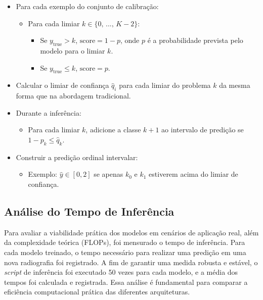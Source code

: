 \begin{itemize}
    \item Para cada exemplo do conjunto de calibração:
    \begin{itemize}
        \item Para cada limiar $k \in \lbrace 0 \text{, } ... \text{, } K-2 \rbrace$:
            \begin{itemize}
                \item Se $y_{\text{true}} > k$, $\text{score} = 1 - p$, onde $p$ é a probabilidade prevista pelo modelo para o limiar $k$.
                \item Se $y_{\text{true}} \leq k$, $\text{score} = p$.
            \end{itemize}
    \end{itemize}
    \item Calcular o limiar de confiança $\hat{q}_i$ para cada limiar do problema $k$ da mesma forma que na abordagem tradicional.
    \item Durante a inferência:
        \begin{itemize}
            \item Para cada limiar $k$, adicione a classe $k+1$ ao intervalo de predição se $1 - p_k \leq \hat{q}_k$.
        \end{itemize}
    \item Construir a predição ordinal intervalar:
        \begin{itemize}
            \item Exemplo: $\hat{y} \in [0,2]$ se apenas $k_0$ e $k_1$ estiverem acima do limiar de confiança.
        \end{itemize}
\end{itemize}

\subsection{Análise do Tempo de Inferência}

Para avaliar a viabilidade prática dos modelos em cenários de aplicação real, além da complexidade teórica (FLOPs), foi mensurado o tempo de inferência. Para cada modelo treinado, o tempo necessário para realizar uma predição em uma nova radiografia foi registrado. A fim de garantir uma medida robusta e estável, o \textit{script} de inferência foi executado 50 vezes para cada modelo, e a média dos tempos foi calculada e registrada. Essa análise é fundamental para comparar a eficiência computacional prática das diferentes arquiteturas.

